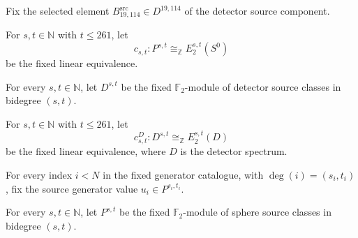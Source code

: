 
\begin{definition}
\label{frontier:E2Computation:0c823d7609b2}
Fix the selected element $B^{\mathrm{src}}_{19,114}\in D^{19,114}$ of the detector source component.
\end{definition}

\begin{definition}
\label{frontier:E2Computation:1359a65ba983}
For $s,t\in\mathbb N$ with $t\leq261$, let
\[c_{s,t}:P^{s,t}\cong_{\mathbb Z}E_2^{s,t}(S^0)\]
be the fixed linear equivalence.
\end{definition}

\begin{definition}
\label{frontier:E2Computation:1dfdcb9f6b7a}
For every $s,t\in\mathbb N$, let $D^{s,t}$ be the fixed $\mathbb F_2$-module of detector source classes in bidegree $(s,t)$.
\end{definition}

\begin{definition}
\label{frontier:E2Computation:3be7c427b9bf}
For $s,t\in\mathbb N$ with $t\leq261$, let
\[c^D_{s,t}:D^{s,t}\cong_{\mathbb Z}E_2^{s,t}(D)\]
be the fixed linear equivalence, where $D$ is the detector spectrum.
\end{definition}

\begin{definition}
\label{frontier:E2Computation:5978caa8605f}
For every index $i<N$ in the fixed generator catalogue, with $\deg(i)=(s_i,t_i)$, fix the source generator value $u_i\in P^{s_i,t_i}$.
\end{definition}

\begin{definition}
\label{frontier:E2Computation:5e3e82d48166}
For every $s,t\in\mathbb N$, let $P^{s,t}$ be the fixed $\mathbb F_2$-module of sphere source classes in bidegree $(s,t)$.
\end{definition}

